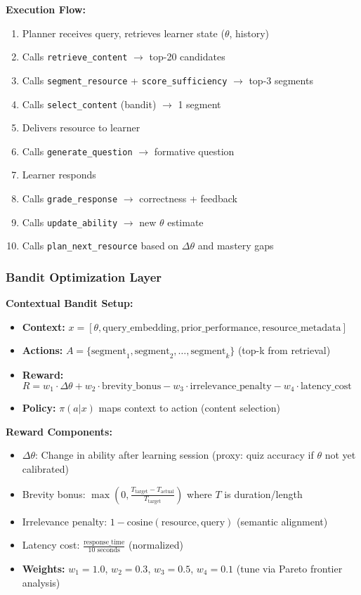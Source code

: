 \documentclass[11pt,letterpaper]{article}
\begin{document}
\textbf{Execution Flow:}
\begin{enumerate}
\item Planner receives query, retrieves learner state ($\theta$, history)
\item Calls \texttt{retrieve\_content} $\rightarrow$ top-20 candidates
\item Calls \texttt{segment\_resource} + \texttt{score\_sufficiency} $\rightarrow$ top-3 segments
\item Calls \texttt{select\_content} (bandit) $\rightarrow$ 1 segment
\item Delivers resource to learner
\item Calls \texttt{generate\_question} $\rightarrow$ formative question
\item Learner responds
\item Calls \texttt{grade\_response} $\rightarrow$ correctness + feedback
\item Calls \texttt{update\_ability} $\rightarrow$ new $\theta$ estimate
\item Calls \texttt{plan\_next\_resource} based on $\Delta\theta$ and mastery gaps
\end{enumerate}

\subsubsection{Bandit Optimization Layer}\label{subsubsec:bandit-optimization}

\textbf{Contextual Bandit Setup:}
\begin{itemize}
\item \textbf{Context:} $x = [\theta, \text{query\_embedding}, \text{prior\_performance}, \text{resource\_metadata}]$
\item \textbf{Actions:} $A = \{\text{segment}_1, \text{segment}_2, \ldots, \text{segment}_k\}$ (top-k from retrieval)
\item \textbf{Reward:} $R = w_1 \cdot \Delta\theta + w_2 \cdot \text{brevity\_bonus} - w_3 \cdot \text{irrelevance\_penalty} - w_4 \cdot \text{latency\_cost}$
\item \textbf{Policy:} $\pi(a|x)$ maps context to action (content selection)
\end{itemize}

\textbf{Reward Components:}
\begin{itemize}
\item $\Delta\theta$: Change in ability after learning session (proxy: quiz accuracy if $\theta$ not yet calibrated)
\item Brevity bonus: $\max(0, \frac{T_{\text{target}} - T_{\text{actual}}}{T_{\text{target}}})$ where $T$ is duration/length
\item Irrelevance penalty: $1 - \text{cosine}(\text{resource}, \text{query})$ (semantic alignment)
\item Latency cost: $\frac{\text{response\_time}}{10 \text{ seconds}}$ (normalized)
\item \textbf{Weights:} $w_1 = 1.0$, $w_2 = 0.3$, $w_3 = 0.5$, $w_4 = 0.1$ (tune via Pareto frontier analysis)
\end{itemize}
\end{document}
